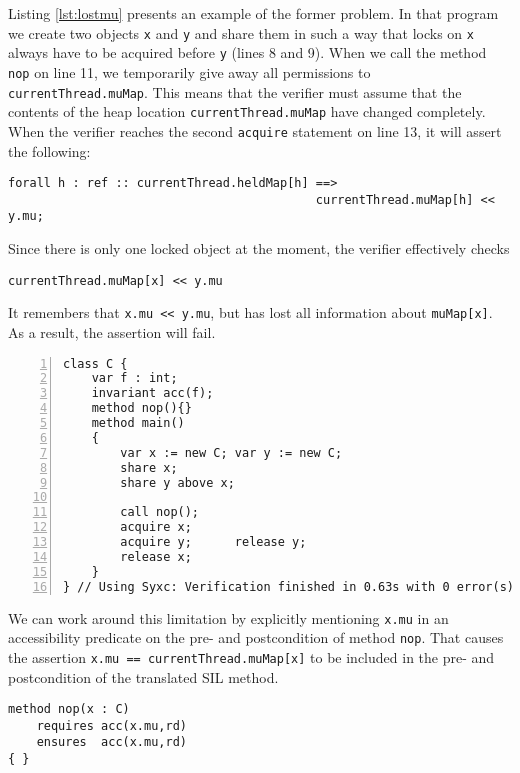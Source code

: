 Listing \ref{lst:lostmu} presents an example of the former problem. 
In that program we create two objects \lstinline!x! and \lstinline!y! and share them in such a way that locks on \lstinline!x! always have to be acquired before \lstinline!y! (lines 8 and 9).
When we call the method \lstinline!nop! on line 11, we temporarily give away all permissions to \lstinline!currentThread.muMap!.
This means that the verifier must assume that the contents of the heap location \lstinline!currentThread.muMap! have changed completely.
When the verifier reaches the second \lstinline[language=Chalice]!acquire! statement on line 13, it will assert the following:
\begin{lstlisting}[language=SIL]
forall h : ref :: currentThread.heldMap[h] ==> 
                                           currentThread.muMap[h] << y.mu;
\end{lstlisting}
Since there is only one locked object at the moment, the verifier effectively checks 
\begin{lstlisting}
currentThread.muMap[x] << y.mu
\end{lstlisting}
It remembers that \lstinline!x.mu << y.mu!, but has lost all information about \lstinline!muMap[x]!.
As a result, the assertion will fail.

\begin{lstlisting}[float,caption={Losing information about \lstinline!mu!.},label=lst:lostmu,language=chalice,numbers=left]
class C {
    var f : int;
    invariant acc(f);
    method nop(){}
    method main()
    {
        var x := new C; var y := new C;
        share x;        
        share y above x;

        call nop();
        acquire x;
        acquire y;      release y;
        release x;
    }
} // Using Syxc: Verification finished in 0.63s with 0 error(s)
\end{lstlisting}

We can work around this limitation by explicitly mentioning \lstinline!x.mu! in an accessibility predicate on the pre- and postcondition of method \lstinline!nop!.
That causes the assertion \lstinline!x.mu == currentThread.muMap[x]! to be included in the pre- and postcondition of the translated SIL method.

\begin{lstlisting}[float,caption={Modified method \lstinline!nop! from listing \ref{lst:lostmu}, causes verification to succeed.},label=lst:lostmufixed,language=chalice]
method nop(x : C)
    requires acc(x.mu,rd)
    ensures  acc(x.mu,rd)
{ }
\end{lstlisting}

